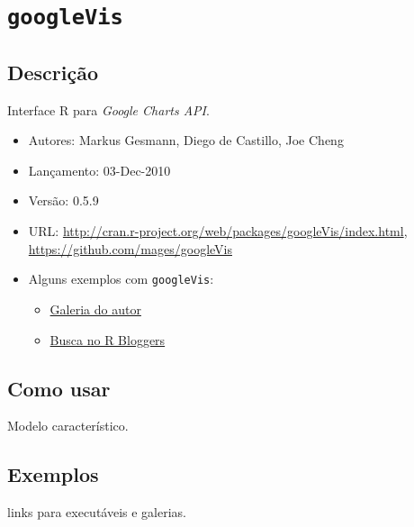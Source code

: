 \section{\texttt{googleVis}}


\subsection{Descrição}

\begin{frame}

  Interface R para \emph{Google Charts API}.

  \begin{itemize}
  \item Autores: Markus Gesmann, Diego de Castillo, Joe Cheng
  \item Lançamento: 03-Dec-2010
  \item Versão: 0.5.9
  \item URL:
    \url{http://cran.r-project.org/web/packages/googleVis/index.html},
    \url{https://github.com/mages/googleVis}
  \item Alguns exemplos com \texttt{googleVis}:
    \begin{itemize}
      
    \item
      \href{http://cran.r-project.org/web/packages/googleVis/vignettes/googleVis_examples.html}{Galeria
        do autor}
    \item \href{http://www.r-bloggers.com/?s=googleVis}{Busca no R
        Bloggers}
    \end{itemize}
  \end{itemize}
  
\end{frame}


\subsection{Como usar}

\begin{frame}
  
  Modelo característico.
  
\end{frame}


\subsection{Exemplos}

\begin{frame}
  
  links para executáveis e galerias.

\end{frame}
